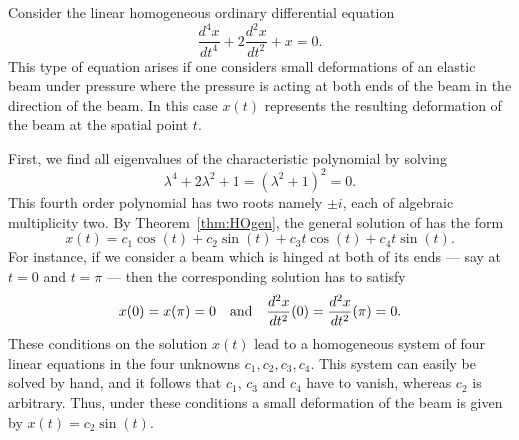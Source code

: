 \documentclass{ximera}
\begin{document}
Consider the linear homogeneous ordinary differential equation
\begin{equation}  \label{eq:soex3}
\frac{d^4x}{dt^4} + 2\frac{d^2x}{dt^2} + x= 0.
\end{equation}
This type of equation arises if one considers small deformations of
an elastic beam under pressure where the pressure is acting at both
ends of the beam in the direction of the beam.  In this case $x(t)$
represents the resulting deformation of the beam at the spatial point $t$.

First, we find all eigenvalues of the characteristic polynomial by solving
\[
\lambda^4 + 2\lambda^2 + 1 = (\lambda^2+1)^2 = 0.
\]
This fourth order polynomial has two roots namely $\pm i$, each of
algebraic multiplicity two.  By Theorem~\ref{thm:HOgen}, the general solution 
of  has the form
\[
x(t) = c_1 \cos(t)+ c_2 \sin(t) +c_3 t\cos(t)+ c_4 t\sin(t).
\]
For instance, if we consider a beam which is hinged at both of its ends ---
say at $t=0$ and $t=\pi$ --- then the corresponding solution has to satisfy
\[
x(0)=x(\pi)=0 \quad\mbox{and}\quad \frac{d^2x}{dt^2}(0)=\frac{d^2x}{dt^2}(\pi)=0.
\]
These conditions on the solution $x(t)$ lead to a homogeneous system of four
linear equations in the four unknowns $c_1,c_2,c_3,c_4$.  This system can
easily be solved by hand, and it follows that $c_1$, $c_3$ and $c_4$ have
to vanish, whereas $c_2$ is arbitrary.  Thus, under these conditions a
small deformation of the beam is given by $x(t)=c_2 \sin(t)$.
\end{document}
